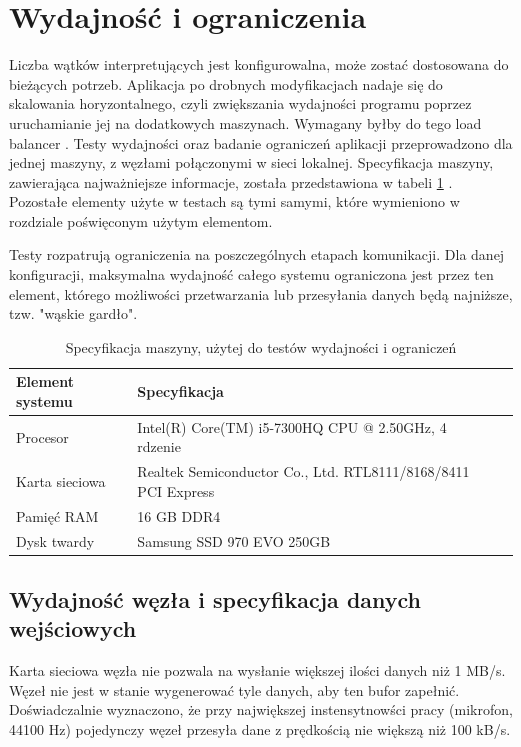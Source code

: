 \documentclass[12pt,oneside,a4paper]{book}
\theoremstyle{break}
\begin{document}
\section{Wydajność i ograniczenia}
Liczba wątków interpretujących jest konfigurowalna,
może zostać dostosowana do bieżących potrzeb. Aplikacja po drobnych
modyfikacjach
nadaje się do skalowania horyzontalnego, czyli zwiększania wydajności
programu poprzez uruchamianie jej na dodatkowych maszynach. Wymagany
byłby do tego load balancer \cite{load-balancer}. Testy wydajności oraz badanie 
ograniczeń aplikacji przeprowadzono dla jednej maszyny, z węzłami
połączonymi w sieci lokalnej. Specyfikacja maszyny, zawierająca
najważniejsze informacje, została przedstawiona w tabeli 
\ref{tab:specyfikacja-maszyny} \cite{dell-specs}. Pozostałe elementy użyte w
testach są tymi samymi, które wymieniono w rozdziale poświęconym
użytym elementom.
\par Testy rozpatrują ograniczenia na poszczególnych etapach
komunikacji. Dla danej konfiguracji, maksymalna wydajność całego
systemu ograniczona jest przez ten element, którego możliwości przetwarzania
lub przesyłania danych będą najniższe, tzw. "wąskie gardło".
\begin{table}[ht]
    \centering
    \begin{tabularx}{\textwidth}{|X | X | X|}
        \hline
        Element systemu & Specyfikacja\\
        \hline
        Procesor &  Intel(R) Core(TM) i5-7300HQ CPU @ 2.50GHz, 4 rdzenie \\ 
        \hline
        Karta sieciowa & Realtek Semiconductor Co., Ltd. RTL8111/8168/8411 PCI Express \\ 
        \hline
        Pamięć RAM & 16 GB DDR4 \\ 
        \hline
        Dysk twardy & Samsung SSD 970 EVO 250GB \\ 
        \hline
        \end{tabularx}
        \caption{Specyfikacja maszyny, użytej do testów wydajności i ograniczeń}
        \label{tab:specyfikacja-maszyny}
\end{table}

\subsection{Wydajność węzła i specyfikacja danych wejściowych}
Karta sieciowa węzła nie pozwala na wysłanie większej ilości
danych niż 1 MB/s. Węzeł nie jest w stanie wygenerować tyle 
danych, aby ten bufor zapełnić. Doświadczalnie wyznaczono, że
przy największej instensytnowści pracy (mikrofon, 44100 Hz)
pojedynczy węzeł przesyła dane z prędkością nie większą niż
100 kB/s.
\end{document}
